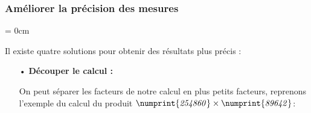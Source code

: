 \documentclass[a4paper, twoside]{article}
\begin{document}
	\vfill

	\newpage







	\subsubsection*{Améliorer la précision des mesures}

	{\parindent = 0cm}

	Il existe quatre solutions pour obtenir des résultats plus précis :

	\begin{itemize}
		
		
		\vspace{0.2cm}
		
		\item[•] \textbf{Découper le calcul :}
		
		\begin{small}
		On peut séparer les facteurs de notre calcul en plus petits facteurs, reprenons l'exemple du calcul du produit $\mathit{\numprint{254860} \times \numprint{89642}}$:\\
		
		\vspace{-2mm}
		\begin{itemize}
		
			

\end{itemize}
\end{small}
\end{itemize}
\end{document}
